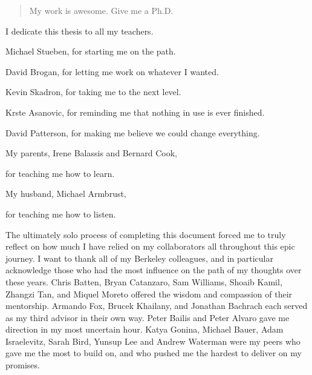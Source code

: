 \documentclass[12pt]{myucthesis}
\begin{document}
\ssp %
\hypersetup{pageanchor=false}

\maketitle
\copyrightpage

\begin{abstract}
My work is awesome. Give me a Ph.D.
\end{abstract}

\hypersetup{pageanchor=true}
\begin{frontmatter}

\begin{dedication}
\null\vfil
{\large
\begin{center}
I dedicate this thesis to all my teachers.
\vspace{1in}

Michael Stueben, for starting me on the path.

David Brogan, for letting me work on whatever I wanted.

Kevin Skadron, for taking me to the next level.

Krste Asanovic, for reminding me that nothing in use is ever finished.

David Patterson, for making me believe we could change everything.
\vspace{1in}

My parents, Irene Balassis and Bernard Cook,

for teaching me how to learn.
\vspace{1in}

My husband, Michael Armbrust,

for teaching me how to listen.

\end{center}}
\null\vfil
\end{dedication}

\tableofcontents
\listoffigures %
\listoftables %


\begin{acknowledgements}

The ultimately solo process of completing this document forced me to truly reflect
on how much I have relied on my collaborators all throughout this epic journey.
I want to thank all of my Berkeley colleagues, and in particular acknowledge
those who had the most influence on the path of my thoughts over these years.
Chris Batten, Bryan Catanzaro, Sam Williams, Shoaib Kamil, Zhangzi Tan, and Miquel Moreto
offered the wisdom and compassion of their mentorship.
Armando Fox, Brucek Khailany, and Jonathan Bachrach each served as my third advisor in their own way.
Peter Bailis and Peter Alvaro gave me direction in my most uncertain hour.
Katya Gonina, Michael Bauer, Adam Israelevitz,
Sarah Bird, Yunsup Lee and Andrew Waterman
were my peers who gave me the most to build on,
and who pushed me the hardest to deliver on my promises.


\end{acknowledgements}
\end{frontmatter}
\end{document}
